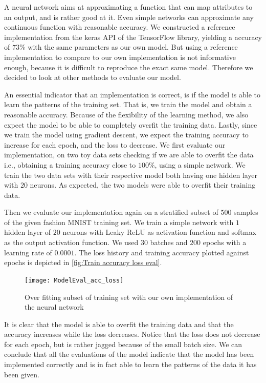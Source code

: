 \documentclass[../main.tex]{subfiles}
\begin{document}
A neural network aims at approximating a function that can map 
attributes to an output, and is rather good at it. Even simple 
networks can approximate any continuous function with reasonable 
accuracy.
We constructed a reference implementation from the keras API 
\autocite{chollet2015keras} of the TensorFlow library, yielding a 
accuracy of $73\%$ with the same parameters as our own model. 
But using a reference implementation to compare to our own 
implementation is not informative enough, because it is difficult 
to reproduce the exact same model. Therefore we decided to 
look at other methods to evaluate our model.

An essential indicator that an implementation is correct, is if 
the model is able to learn the patterns of the training set. 
That is, we train the model and obtain a reasonable accuracy. 
Because of the flexibility of the learning method, we also expect 
the model to be able to completely overfit the training data. 
Lastly, since we train the model using gradient descent, we 
expect the training accuracy to increase for each epoch, and the 
loss to decrease. 
We first evaluate our implementation, on two toy data sets 
checking if we are able to overfit the data i.e., obtaining a 
training accuracy close to $100\%$, using a simple network. We 
train the two data sets with their respective model both having 
one hidden layer with $20$ neurons. As expected, the two models 
were able to overfit their training data. 

Then we evaluate our implementation again on a stratified subset 
of $500$ samples of the given fashion MNIST training set. We 
train a simple network with $1$ hidden layer of $20$ neurons with 
Leaky ReLU as activation function and softmax as the output 
activation function. We used $30$ batches and $200$ epochs with a 
learning rate of $0.0001$. The loss history and training accuracy 
plotted against epochs is depicted in \autoref{fig:Train accuracy 
loss eval}.

\begin{figure}[ht]
    \centering
    \texttt{[image: ModelEval\_acc\_loss]}
    \caption{Over fitting subset of training set with our own 
    implementation of the neural network}
    \label{fig:Train accuracy loss eval}
\end{figure}

It is clear that the model is able to overfit the training data 
and that the accuracy increases while the loss decreases. Notice 
that the loss does not decrease for each epoch, but is rather 
jagged because of the small batch size.
We can conclude that all the evaluations of the model indicate 
that the model has been implemented correctly and is in fact able 
to learn the patterns of the data it has been given. 
\end{document}
